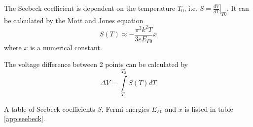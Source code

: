 The Seebeck coefficient is dependent on the temperature $T_0$, i.e. $S = \left.\frac{dV}{dT}\right|_{T0}$.
It can be calculated by the Mott and Jones equation
\begin{equation}
    S(T) \approx -\frac{\pi^2 k^2 T}{3 e E_{F0}} x
\end{equation}
where $x$ is a numerical constant.

The voltage difference between 2 points can be calculated by
\begin{equation}
    \Delta V = \int\limits_{T_1}^{T_2} S(T) dT
\end{equation}

A table of Seebeck coefficients $S$, Fermi energies $E_{F0}$ and $x$ is listed in table \ref{app:seebeck}.


